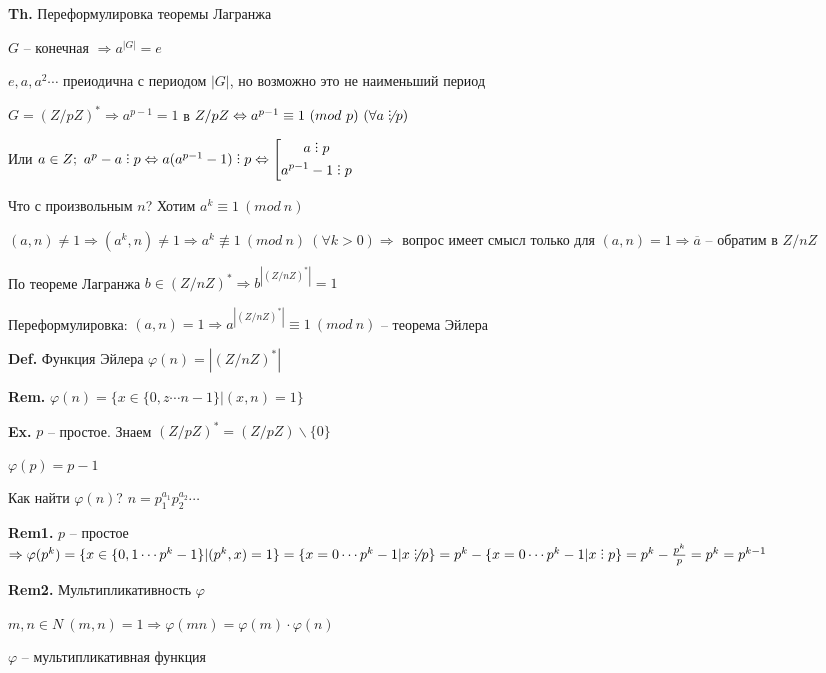 \documentclass[14pt, letter paper]{article}
\DeclareRobustCommand{\divby}{%
  \mathrel{\text{\vbox{\baselineskip.65ex\lineskiplimit0pt\hbox{.}\hbox{.}\hbox{.}}}}%
}
\begin{document}
\vspace{5mm}

\textbf{Th.} Переформулировка теоремы Лагранжа

$G$ -- конечная $\Rightarrow a^{|G|} = e$

$e, a, a^2 \cdots$ преиодична с периодом $|G|$, но возможно это не наименьший период

$G = (Z/pZ)^* \Rightarrow a^{p-1} = 1$ в $Z/pZ \Leftrightarrow a^{p-1} \equiv 1\ (mod\ p)\ (\forall a \not\divby p)$

Или $a \in Z;\ a^p - a \divby p \Leftrightarrow a(a^{p-1}-1) \divby p \Leftrightarrow \left[ \begin{gathered}
    a \divby p \\
    a^{p-1} - 1 \divby p
\end{gathered} \right.$
\vspace{5mm}

Что с произвольным $n$? Хотим $a^k \equiv 1\ (mod\ n)$

$(a, n) \neq 1 \Rightarrow (a^k, n) \neq 1 \Rightarrow a^k \not\equiv 1\ (mod\ n)\ (\forall k > 0) \Rightarrow$ вопрос имеет смысл только для $(a, n) = 1 \Rightarrow \overline{a}$ -- обратим в $Z/nZ$

По теореме Лагранжа $b \in (Z/nZ)^* \Rightarrow b^{|(Z/nZ)^*|} = 1$

Переформулировка: $(a, n) = 1 \Rightarrow a^{|(Z/nZ)^*|} \equiv 1\ (mod\ n)$ -- теорема Эйлера

\vspace{5mm}

\textbf{Def.} Функция Эйлера $\varphi(n) = |(Z/nZ)^*|$

\textbf{Rem.} $\varphi(n) = \{x \in \{0, z \cdots n-1\} | (x, n) = 1\}$

\textbf{Ex.} $p$ -- простое. Знаем $(Z/pZ)^* = (Z/pZ) \backslash \{0\}$

$\varphi(p) = p - 1$

Как найти $\varphi(n)$? $n = p_1^{a_1} p_2^{a_2} \cdots$

\textbf{Rem1.} $p$ -- простое $\Rightarrow \varphi(p^k) = \{x \in \{0, 1 \cdots p^k-1\}| (p^k, x) = 1\} = \{x = 0 \cdots p^k-1| x \not\divby p\} = p^k - \{x = 0 \cdots p^k-1| x \divby p\} = p^k - \frac{p^k}{p} = p^k = p^{k-1}$

\textbf{Rem2.} Мультипликативность $\varphi$

$m, n \in N\ (m, n) = 1 \Rightarrow \varphi(mn) = \varphi(m) \cdot \varphi(n)$

$\varphi$ -- мультипликативная функция
\end{document}
